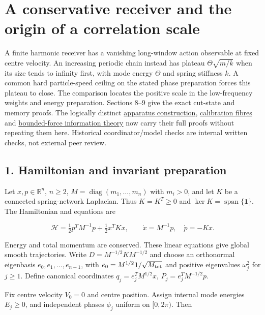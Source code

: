 \documentclass[11pt,a4paper]{article}
\begin{document}
\hypertarget{a-conservative-receiver-and-the-origin-of-a-correlation-scale}{%
\section{A conservative receiver and the origin of a correlation
scale}\label{a-conservative-receiver-and-the-origin-of-a-correlation-scale}}

A finite harmonic receiver has a vanishing long-window action observable
at fixed centre velocity. An increasing periodic chain instead has
plateau \(\Theta\sqrt{m/k}\) when its size tends to infinity first, with
mode energy \(\Theta\) and spring stiffness \(k\). A common hard
particle-speed ceiling on the stated phase preparation forces this
plateau to close. The comparison locates the positive scale in the
low-frequency weights and energy preparation. Sections 8--9 give the
exact cut-state and memory proofs. The logically distinct
\href{autonomous-finite-readout.md}{apparatus construction},
\href{calibration-tolerance-recovery.md}{calibration fibres} and
\href{causal-force-information.md}{bounded-force information theory} now
carry their full proofs without repeating them here. Historical
coordinator/model checks are internal written checks, not external peer
review.

\hypertarget{hamiltonian-and-invariant-preparation}{%
\subsection{1. Hamiltonian and invariant
preparation}\label{hamiltonian-and-invariant-preparation}}

Let \(x,p\in\mathbb R^n\), \(n\ge2\),
\(M=\operatorname{diag}(m_1,\ldots,m_n)\) with \(m_i>0\), and let \(K\)
be a connected spring-network Laplacian. Thus \(K=K^T\ge0\) and
\(\ker K=\operatorname{span}\{\mathbf1\}\). The Hamiltonian and
equations are

\[
\mathcal H=\tfrac12p^TM^{-1}p+\tfrac12x^TKx,\qquad
\dot x=M^{-1}p,\quad\dot p=-Kx.
\]

Energy and total momentum are conserved. These linear equations give
global smooth trajectories. Write \(D=M^{-1/2}KM^{-1/2}\) and choose an
orthonormal eigenbasis \(e_0,e_1,\ldots,e_{n-1}\), with
\(e_0=M^{1/2}\mathbf1/\sqrt{M_{\rm tot}}\) and positive eigenvalues
\(\omega_j^2\) for \(j\ge1\). Define canonical coordinates
\(q_j=e_j^TM^{1/2}x\), \(P_j=e_j^TM^{-1/2}p\).

Fix centre velocity \(V_0=0\) and centre position. Assign internal mode
energies \(E_j\ge0\), and independent phases \(\phi_j\) uniform on
\([0,2\pi)\). Then
\end{document}
